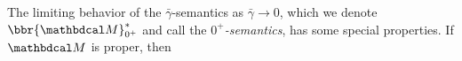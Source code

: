 \documentclass{article}
\newcommand\discard[1]{}
\newcommand\obslimit{observational facet} %
\newcommand\zogamma{{\bar\gamma}}
\begin{document}
The limiting behavior of the $\zogamma$-semantics as $\zogamma \to 0$,
% 
which we denote $\bbr{\dg M}^*_{0^+}$ and call the \emph{$0^+$\!-semantics},
has some special properties.
\discard{Supposing that $\bbeta > \mat 0$,%
    \footnote{or, more generally, that $\bbeta \gg \balpha$,
        (i.e., if $\alpha_a>0$ then $\beta_a>0$), 
        which, for every $\gamma > 0$, is weaker than $\bbeta \ge \gamma \balpha$. }}%
If $\dg M$ is proper, then        
\end{document}
